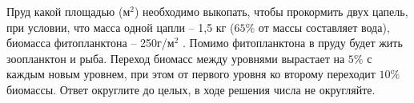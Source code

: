 
Пруд
какой площадью (м$^2$) необходимо выкопать, чтобы прокормить двух
цапель, при условии, что масса одной цапли – 1,5 кг ($65\%$ от массы составляет
вода), биомасса фитопланктона – 250г/м$^2$ . Помимо фитопланктона в
пруду будет жить зоопланктон и рыба. Переход биомасс между уровнями вырастает
на $5\%$ с каждым новым уровнем, при этом от первого уровня ко второму переходит
$10\%$ биомассы. Ответ округлите до целых, в ходе решения числа не округляйте.

\explanationSection

